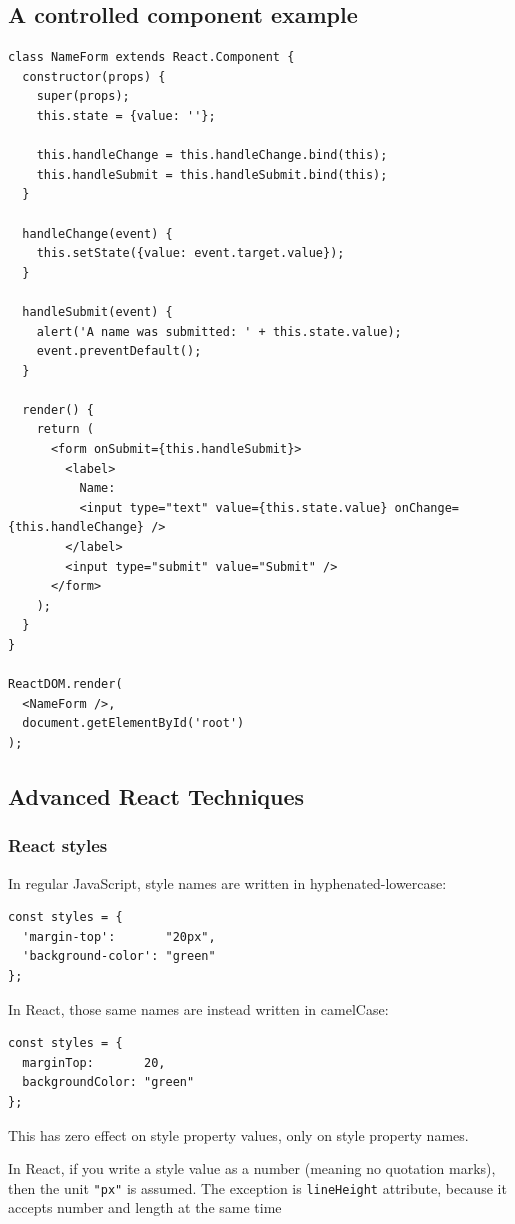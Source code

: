 \documentclass[a4paper, 12pt]{article}
\begin{document}
\subsection{A controlled component example}
\begin{verbatim}
class NameForm extends React.Component {
  constructor(props) {
    super(props);
    this.state = {value: ''};

    this.handleChange = this.handleChange.bind(this);
    this.handleSubmit = this.handleSubmit.bind(this);
  }

  handleChange(event) {
    this.setState({value: event.target.value});
  }

  handleSubmit(event) {
    alert('A name was submitted: ' + this.state.value);
    event.preventDefault();
  }

  render() {
    return (
      <form onSubmit={this.handleSubmit}>
        <label>
          Name:
          <input type="text" value={this.state.value} onChange={this.handleChange} />
        </label>
        <input type="submit" value="Submit" />
      </form>
    );
  }
}

ReactDOM.render(
  <NameForm />,
  document.getElementById('root')
);
\end{verbatim}


\subsection{Advanced React Techniques}

\subsubsection{React styles}
In regular JavaScript, style names are written in hyphenated-lowercase:
\begin{verbatim}
const styles = {
  'margin-top':       "20px",
  'background-color': "green"
};
\end{verbatim}

In React, those same names are instead written in camelCase:
\begin{verbatim}
const styles = {
  marginTop:       20,
  backgroundColor: "green"
};
\end{verbatim}
This has zero effect on style property values, only on style property names.

In React, if you write a style value as a number {\color{red}(meaning no quotation marks)}, then the unit \verb|"px"| is assumed. The exception is \verb|lineHeight| attribute, because it accepts number and length at the same time
\end{document}

